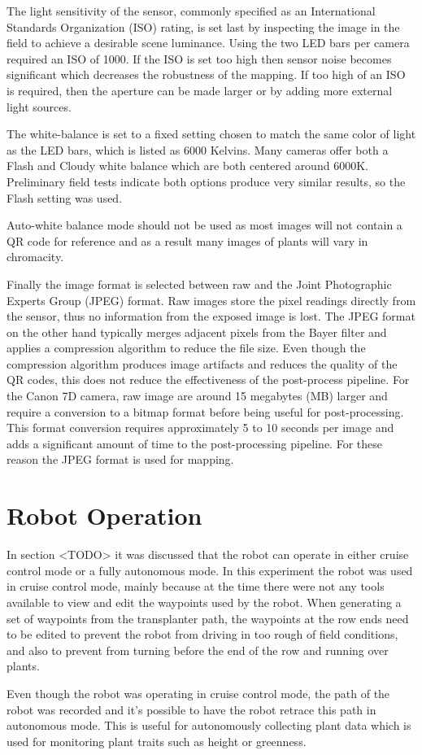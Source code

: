 The light sensitivity of the sensor, commonly specified as an International Standards Organization (ISO) rating, is set last by inspecting the image in the field to achieve a desirable scene luminance.  Using the two LED bars per camera required an ISO of 1000.  If the ISO is set too high then sensor noise becomes significant which decreases the robustness of the mapping.  If too high of an ISO is required, then the aperture can be made larger or by adding more external light sources.  

The white-balance is set to a fixed setting chosen to match the same color of light as the LED bars, which is listed as 6000 Kelvins.  Many cameras offer both a Flash and Cloudy white balance which are both centered around 6000K.   Preliminary field tests indicate both options produce very similar results, so the Flash setting was used.   

Auto-white balance mode should not be used as most images will not contain a QR code for reference and as a result many images of plants will vary in chromacity. 

Finally the image format is selected between raw and the Joint Photographic Experts Group (JPEG) format.  Raw images store the pixel readings directly from the sensor, thus no information from the exposed image is lost.  The JPEG format on the other hand typically merges adjacent pixels from the Bayer filter and applies a compression algorithm to reduce the file size.  Even though the compression algorithm produces image artifacts and reduces the quality of the QR codes, this does not reduce the effectiveness of the post-process pipeline. For the Canon 7D camera, raw image are around 15 megabytes (MB) larger and require a conversion to a bitmap format before being useful for post-processing.  This format conversion requires approximately 5 to 10 seconds per image and adds a significant amount of time to the post-processing pipeline.  For these reason the JPEG format is used for mapping.

\section{Robot Operation}

In section <TODO> it was discussed that the robot can operate in either cruise control mode or a fully autonomous mode.  In this experiment the robot was used in cruise control mode, mainly because at the time there were not any tools available to view and edit the waypoints used by the robot.  When generating a set of waypoints from the transplanter path, the waypoints at the row ends need to be edited to prevent the robot from driving in too rough of field conditions, and also to prevent from turning before the end of the row and running over plants. 

Even though the robot was operating in cruise control mode, the path of the robot was recorded and it's possible to have the robot retrace this path in autonomous mode.  This is useful for autonomously collecting plant data which is used for monitoring plant traits such as height or greenness.
